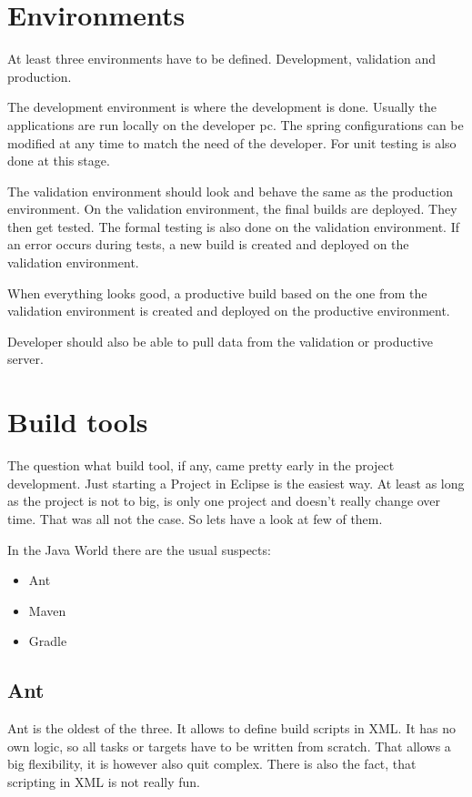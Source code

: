 \documentclass[paper=a4,twoside=false,BCOR=0mm,DIV=calc,fontsize=12pt]{scrartcl}
\begin{document}




\section{Environments}
At least three environments have to be defined. Development, validation and production. 

The development environment is where the development is done. Usually the applications are run locally on the developer pc. The spring configurations can be modified at any time to match the need of the developer.
For unit testing is also done at this stage.

The validation environment should look and behave the same as the production environment. On the validation environment, the final builds are deployed. They then get tested. The formal testing is also done on the validation environment. If an error occurs during tests, a new build is created and deployed on the validation environment.

When everything looks good, a productive build based on the one from the validation environment is created and deployed on the productive environment.

Developer should also be able to pull data from the validation or productive server.

\section{Build tools}
The question what build tool, if any, came pretty early in the project development. Just starting a Project in Eclipse is the easiest way. 
At least as long as the project is not to big, is only one project and doesn't really change over time. That was all not the case. So lets have a look at few of them. 

In the Java World there are the usual suspects:
\begin{itemize}
 \item Ant
 \item Maven
 \item Gradle
\end{itemize}

\subsection{Ant}
Ant is the oldest of the three. It allows to define build scripts in XML. 
It has no own logic, so all tasks or targets have to be written from scratch.
That allows a big flexibility, it is however also quit complex. There is also the fact,
that scripting in XML is not really fun.
\end{document}
